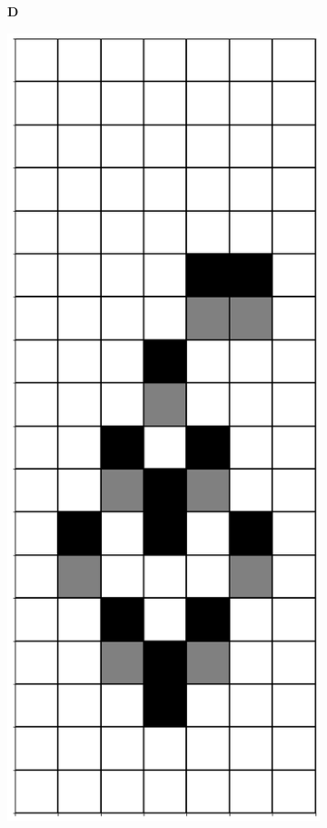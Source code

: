 \documentclass[12pt]{article}
\numberwithin{figure}{section} %
\begin{document}
\begin{figure}[H]\ContinuedFloat
     	\begin{subfigure}[t]{0.03\textwidth}
    		\textbf{D}
  	\end{subfigure}	
	\begin{subfigure}{0.18\textwidth}
     		\centering
     		\includegraphics[width=\linewidth]{Section4/18.0}

\end{subfigure}
\end{figure}
\end{document}
